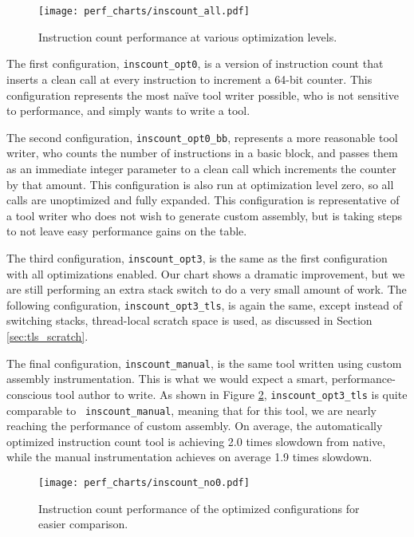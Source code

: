 \begin{figure}
\texttt{[image: perf\_charts/inscount\_all.pdf]}
\caption{Instruction count performance at various optimization levels.}
\label{fig:inscount_all}
\end{figure}

The first configuration, {\tt inscount\_opt0}, is a version of instruction count
that inserts a clean call at every instruction to increment a 64-bit counter.
This configuration represents the most na\"ive tool writer possible, who is not
sensitive to performance, and simply wants to write a tool.

The second configuration, {\tt inscount\_opt0\_bb}, represents a more reasonable
tool writer, who counts the number of instructions in a basic block, and passes
them as an immediate integer parameter to a clean call which increments the
counter by that amount.  This configuration is also run at optimization level
zero, so all calls are unoptimized and fully expanded.  This configuration is
representative of a tool writer who does not wish to generate custom assembly,
but is taking steps to not leave easy performance gains on the table.

The third configuration, {\tt inscount\_opt3}, is the same as the first
configuration with all optimizations enabled.  Our chart shows a dramatic
improvement, but we are still performing an extra stack switch to do a very
small amount of work.  The following configuration, {\tt inscount\_opt3\_tls},
is again the same, except instead of switching stacks, thread-local scratch
space is used, as discussed in Section \ref{sec:tls_scratch}.

The final configuration, {\tt inscount\_manual}, is the same tool written using
custom assembly instrumentation.  This is what we would expect a smart,
performance-conscious tool author to write.  As shown in Figure
\ref{fig:inscount_no0}, {\tt inscount\_opt3\_tls} is quite comparable to {\tt
inscount\_manual}, meaning that for this tool, we are nearly reaching the
performance of custom assembly.  On average, the automatically optimized
instruction count tool is achieving 2.0 times slowdown from native, while the
manual instrumentation achieves on average 1.9 times slowdown.

\begin{figure}
\texttt{[image: perf\_charts/inscount\_no0.pdf]}
\caption{Instruction count performance of the optimized configurations for
easier comparison.}
\label{fig:inscount_no0}
\end{figure}

